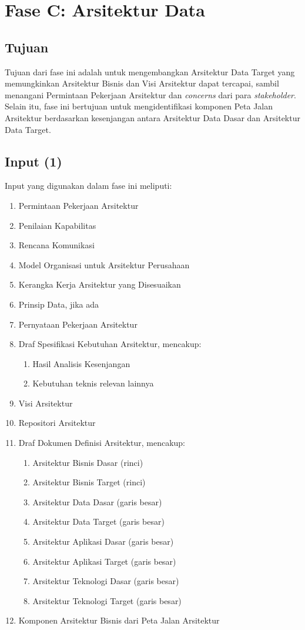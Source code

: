 \chapter{Fase C: Arsitektur Data}

\section{Tujuan}
Tujuan dari fase ini adalah untuk mengembangkan Arsitektur Data Target yang memungkinkan Arsitektur Bisnis dan Visi Arsitektur dapat tercapai, sambil menangani Permintaan Pekerjaan Arsitektur dan \textit{concerns} dari para \textit{stakeholder}. Selain itu, fase ini bertujuan untuk mengidentifikasi komponen Peta Jalan Arsitektur berdasarkan kesenjangan antara Arsitektur Data Dasar dan Arsitektur Data Target.

\section{Input (1)}
Input yang digunakan dalam fase ini meliputi:
\begin{enumerate}
	\item Permintaan Pekerjaan Arsitektur
	\item Penilaian Kapabilitas
	\item Rencana Komunikasi
	\item Model Organisasi untuk Arsitektur Perusahaan
	\item Kerangka Kerja Arsitektur yang Disesuaikan
	\item Prinsip Data, jika ada
	\item Pernyataan Pekerjaan Arsitektur
	\item Draf Spesifikasi Kebutuhan Arsitektur, mencakup:
	\begin{enumerate}
		\item Hasil Analisis Kesenjangan
		\item Kebutuhan teknis relevan lainnya
	\end{enumerate}
	\item Visi Arsitektur
	\item Repositori Arsitektur
	\item Draf Dokumen Definisi Arsitektur, mencakup:
	\begin{enumerate}
		\item Arsitektur Bisnis Dasar (rinci)
		\item Arsitektur Bisnis Target (rinci)
		\item Arsitektur Data Dasar (garis besar)
		\item Arsitektur Data Target (garis besar)
		\item Arsitektur Aplikasi Dasar (garis besar)
		\item Arsitektur Aplikasi Target (garis besar)
		\item Arsitektur Teknologi Dasar (garis besar)
		\item Arsitektur Teknologi Target (garis besar)
	\end{enumerate}
	\item Komponen Arsitektur Bisnis dari Peta Jalan Arsitektur
\end{enumerate}

